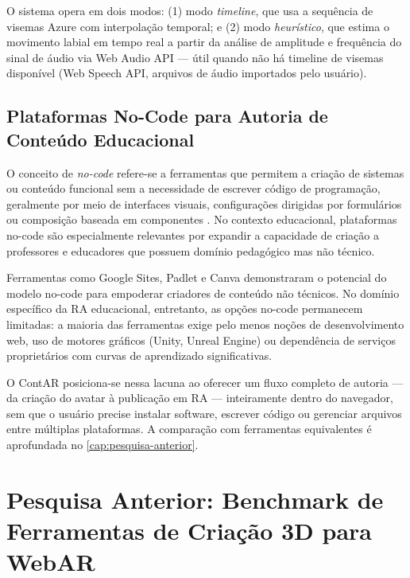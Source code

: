 \documentclass[
  12pt,
  openright,
  twoside,
  a4paper,
  english,
  brazil
]{abntex2}
\begin{document}
O sistema opera em dois modos: (1) modo \textit{timeline}, que usa a
sequência de visemas Azure com interpolação temporal; e
(2) modo \textit{heurístico}, que estima o movimento labial em tempo real
a partir da análise de amplitude e frequência do sinal de áudio via Web
Audio API — útil quando não há timeline de visemas disponível
(Web Speech API, arquivos de áudio importados pelo usuário).

\section{Plataformas No-Code para Autoria de Conteúdo Educacional}
\label{sec:nocode}

O conceito de \textit{no-code} refere-se a ferramentas que permitem a
criação de sistemas ou conteúdo funcional sem a necessidade de escrever
código de programação, geralmente por meio de interfaces visuais,
configurações dirigidas por formulários ou composição baseada em componentes
\cite{nocode2022}. No contexto educacional, plataformas no-code são
especialmente relevantes por expandir a capacidade de criação a professores
e educadores que possuem domínio pedagógico mas não técnico.

Ferramentas como Google Sites, Padlet e Canva demonstraram o potencial
do modelo no-code para empoderar criadores de conteúdo não técnicos.
No domínio específico da RA educacional, entretanto, as opções no-code
permanecem limitadas: a maioria das ferramentas exige pelo menos noções
de desenvolvimento web, uso de motores gráficos (Unity, Unreal Engine)
ou dependência de serviços proprietários com curvas de aprendizado
significativas.

O ContAR posiciona-se nessa lacuna ao oferecer um fluxo completo de autoria
— da criação do avatar à publicação em RA — inteiramente dentro do navegador,
sem que o usuário precise instalar software, escrever código ou gerenciar
arquivos entre múltiplas plataformas. A comparação com ferramentas
equivalentes é aprofundada no \autoref{cap:pesquisa-anterior}.


\chapter{Pesquisa Anterior: Benchmark de Ferramentas de Criação 3D para WebAR}
\label{cap:pesquisa-anterior}
\end{document}
